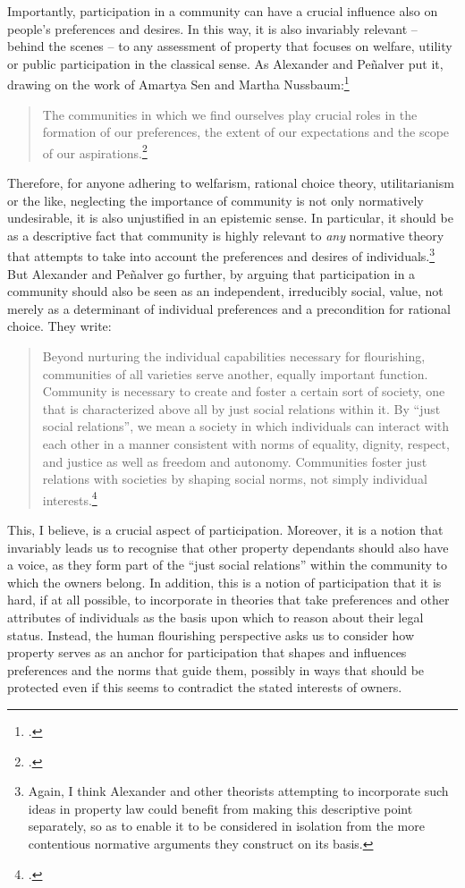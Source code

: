 Importantly, participation in a community can have a crucial influence also on people's preferences and desires. In this way, it is also invariably relevant -- behind the scenes -- to any assessment of property that focuses on welfare, utility or public participation in the classical sense. As Alexander and Pe\~{n}alver put it, drawing on the work of Amartya Sen and Martha Nussbaum:\footcite{sen84,sen85,sen99,nussbaum00,nussbaum02}
\begin{quote}
The communities in which we find ourselves play crucial roles in the formation of our preferences, the extent of our expectations and the scope of our aspirations.\footcite[140]{alexander09}
\end{quote}
Therefore, for anyone adhering to welfarism, rational choice theory, utilitarianism or the like, neglecting the importance of community is not only normatively undesirable, it is also unjustified in an epistemic sense. In particular, it should be  as a descriptive fact that community is highly relevant to {\it any} normative theory that attempts to take into account the preferences and desires of individuals.\footnote{Again, I think Alexander and other theorists attempting to incorporate such ideas in property law could benefit from making this descriptive point separately, so as to enable it to be considered in isolation from the more contentious normative arguments they construct on its basis.} But Alexander and Pe\~{n}alver go further, by arguing that participation in a community should also be seen as an independent, irreducibly social, value, not merely as a determinant of individual preferences and a precondition for rational choice. They write:

\begin{quote}
Beyond nurturing the individual capabilities necessary for flourishing, communities of all varieties serve another, equally important function. Community is necessary to create and foster a certain sort of society, one that is characterized above all by just social relations within it. By ``just social relations'', we mean a society in which individuals can interact with each other in a manner consistent with norms of equality, dignity, respect, and justice as well as freedom and autonomy. Communities foster just relations with societies by shaping social norms, not simply individual interests.\footcite[140]{alexander09}
\end{quote}

This, I believe, is a crucial aspect of participation. Moreover, it is a notion that invariably leads us to recognise that other property dependants should also have a voice, as they form part of the ``just social relations'' within the community to which the owners belong. In addition, this is a notion of participation that it is hard, if at all possible, to incorporate in theories that take preferences and other attributes of individuals as the basis upon which to reason about their legal status. Instead, the human flourishing perspective asks us to consider how property serves as an anchor for participation that shapes and influences preferences and the norms that guide them, possibly in ways that should be protected even if this seems to contradict the stated interests of owners.

